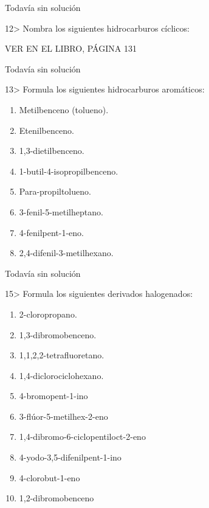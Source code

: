\documentclass{article}
\begin{document}
\begin{solution}[print=false]
  Todavía sin solución
\end{solution}

\begin{exercise}
  12> Nombra los siguientes hidrocarburos cíclicos:

  VER EN EL LIBRO, PÁGINA 131
\end{exercise}

\begin{solution}[print=false]
  Todavía sin solución
\end{solution}

\begin{exercise}
  13> Formula los siguientes hidrocarburos aromáticos:
  \begin{enumerate}
    \item Metilbenceno (tolueno).
    \item Etenilbenceno.
    \item 1,3-dietilbenceno.
    \item 1-butil-4-isopropilbenceno.
    \item Para-propiltolueno.
    \item 3-fenil-5-metilheptano.
    \item 4-fenilpent-1-eno.
    \item 2,4-difenil-3-metilhexano.
  \end{enumerate}
\end{exercise}

\begin{solution}[print=false]
  Todavía sin solución
\end{solution}

\begin{exercise}
  15> Formula los siguientes derivados halogenados:
  \begin{enumerate}
    \item 2-cloropropano.
    \item 1,3-dibromobenceno.
    \item 1,1,2,2-tetrafluoretano.
    \item 1,4-diclorociclohexano.
    \item 4-bromopent-1-ino
    \item 3-flúor-5-metilhex-2-eno
    \item 1,4-dibromo-6-ciclopentiloct-2-eno
    \item 4-yodo-3,5-difenilpent-1-ino
    \item 4-clorobut-1-eno
    \item 1,2-dibromobenceno
  \end{enumerate}
\end{exercise}
\end{document}
